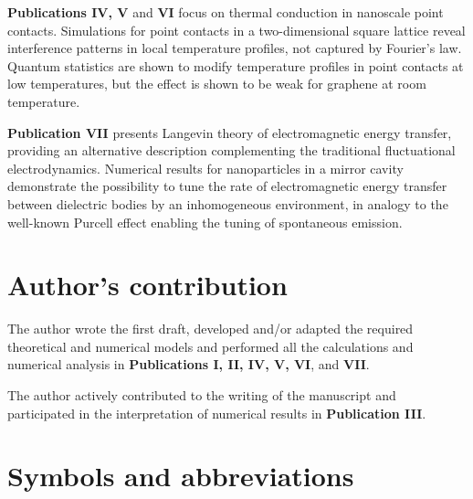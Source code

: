 \documentclass[dissertation]{aaltoseries}
\newcommand{\listofsymbols}{%
  \chapter*{Symbols and abbreviations}%
}
\begin{document}
\vspace{1cm}
\noindent
\textbf{Publications IV, V} and \textbf{VI} focus on thermal conduction in nanoscale point contacts. Simulations for point contacts in a two-dimensional square lattice reveal interference patterns in local temperature profiles, not captured by Fourier's law. Quantum statistics are shown to modify temperature profiles in point contacts at low temperatures, but the effect is shown to be weak for graphene at room temperature.

\vspace{1cm}
\noindent
\textbf{Publication VII} presents Langevin theory of electromagnetic energy transfer, providing an alternative description complementing the traditional fluctuational electrodynamics. Numerical results for nanoparticles in a mirror cavity demonstrate the possibility to tune the rate of electromagnetic energy transfer between dielectric bodies by an inhomogeneous environment, in analogy to the well-known Purcell effect enabling the tuning of spontaneous emission.

\chapter*{Author's contribution}
The author wrote the first draft, developed and/or adapted the required theoretical and numerical models and performed all the calculations and numerical analysis in \textbf{Publications I, II, IV, V, VI}, and \textbf{VII}.

\vspace{1cm}
\noindent
The author actively contributed to the writing of the manuscript and participated in the interpretation of numerical results in \textbf{Publication III}.

\listofsymbols
{}
\end{document}
